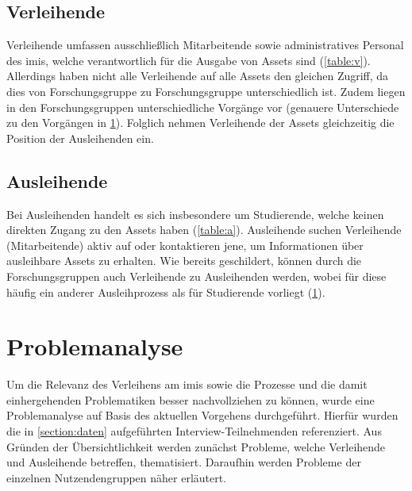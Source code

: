 \subsection{Verleihende}
Verleihende umfassen ausschließlich Mitarbeitende sowie administratives
Personal des \ac{imis}, welche verantwortlich für die Ausgabe von Assets sind
(\ref{table:v}). Allerdings haben nicht alle Verleihende auf alle Assets den
gleichen Zugriff, da dies von Forschungsgruppe zu Forschungsgruppe
unterschiedlich ist. Zudem liegen in den Forschungsgruppen unterschiedliche
Vorgänge vor (genauere Unterschiede zu den Vorgängen in \ref{section:iststand}).
Folglich nehmen Verleihende der Assets gleichzeitig die Position der
Ausleihenden ein.

\subsection{Ausleihende}
Bei Ausleihenden handelt es sich insbesondere um Studierende, welche keinen
direkten Zugang zu den Assets haben (\ref{table:a}). Ausleihende suchen
Verleihende (Mitarbeitende) aktiv auf oder kontaktieren jene, um Informationen
über ausleihbare Assets zu erhalten. Wie bereits geschildert, können durch die
Forschungsgruppen auch Verleihende zu Ausleihenden werden, wobei für diese
häufig ein anderer Ausleihprozess als für Studierende vorliegt
(\ref{section:iststand}).


\section{Problemanalyse}
\label{section:iststand}

Um die Relevanz des Verleihens am \ac{imis} sowie die Prozesse und die damit
einhergehenden Problematiken besser nachvollziehen zu können, wurde eine
Problemanalyse auf Basis des aktuellen Vorgehens durchgeführt. Hierfür wurden
die in \ref{section:daten} aufgeführten Interview-Teilnehmenden referenziert.
Aus Gründen der Übersichtlichkeit werden zunächst Probleme, welche
Verleihende und Ausleihende betreffen, thematisiert. Daraufhin werden Probleme
der einzelnen Nutzendengruppen näher erläutert.

